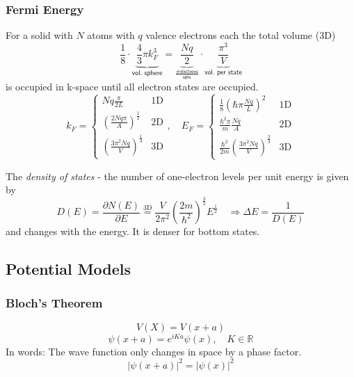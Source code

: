 \subsubsection{Fermi Energy}
For a solid with $N$ atoms with $q$ valence electrons each the total volume (3D)
\noindent\begin{equation*}
    \frac{1}{8}\cdot\underbrace{\frac{4}{3}\pi k_F^3}_{\textsf{vol. sphere}} = \underbrace{\frac{Nq}{2}}_{\frac{\textsf{\# electrons}}{\mathsf{spin}}}\cdot \underbrace{\frac{\pi^3}{V}}_{\textsf{vol. per state}}
\end{equation*}
is occupied in k-space until all electron states are occupied.
\noindent\begin{equation*}
    k_F  = \begin{cases}
        Nq\frac{\pi}{2L}                                  & \mathrm{1D} \\
        {\left(\frac{2Nq\pi}{A}\right)}^\frac{1}{2}       & \mathrm{2D} \\
        {\left(\frac{3\pi^2 N q}{V}\right)}^{\frac{1}{3}} & \mathrm{3D}
    \end{cases}, \quad
    E_F  = \begin{cases}
        \frac{1}{8}\left(\hbar \pi \frac{Nq}{L}\right)^2                    & \mathrm{1D} \\
        \frac{\hbar^2 \pi}{m} \frac{Nq}{A}                                  & \mathrm{2D} \\
        \frac{\hbar^2}{2m}{\left(\frac{3\pi^2 N q}{V}\right)}^{\frac{2}{3}} & \mathrm{3D}
    \end{cases}
\end{equation*}

\newpar{}

The \textit{density of states} - the number of one-electron levels per unit energy is given by
\noindent\begin{equation*}
    D(E)=\frac{\partial N(E)}{\partial E} \overset{\mathrm{3D}}{=} \frac{V}{2\pi^2}{\left(\frac{2m}{\hbar^2}\right)}^{\frac{3}{2}} E^{\frac{1}{2}} \quad \Rightarrow \Delta E = \frac{1}{D(E)}
\end{equation*}
and changes with the energy. It is denser for bottom states.

\subsection{Potential Models}
\subsubsection{Bloch's Theorem}
\noindent\begin{equation*}
    V(X) = V(x+a)
\end{equation*}
\noindent\begin{equation*}
    \psi(x+a) = e^{iKa} \psi(x), \quad K\in \mathbb{R}
\end{equation*}
In words: The wave function only changes in space by a phase factor.
\noindent\begin{equation*}
    {|\psi(x+a)|}^2={|\psi(x)|}^2
\end{equation*}

